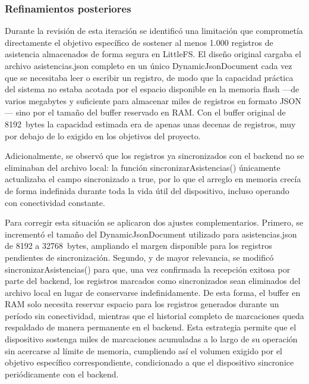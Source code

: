 \subsubsection{Refinamientos posteriores}

Durante la revisión de esta iteración se identificó una limitación que comprometía directamente el objetivo específico de sostener al menos 1.000 registros de asistencia almacenados de forma segura en LittleFS. El diseño original cargaba el archivo asistencias.json completo en un único DynamicJsonDocument cada vez que se necesitaba leer o escribir un registro, de modo que la capacidad práctica del sistema no estaba acotada por el espacio disponible en la memoria flash —de varios megabytes y suficiente para almacenar miles de registros en formato JSON— sino por el tamaño del buffer reservado en RAM. Con el buffer original de 8192~bytes la capacidad estimada era de apenas unas decenas de registros, muy por debajo de lo exigido en los objetivos del proyecto.

Adicionalmente, se observó que los registros ya sincronizados con el backend no se eliminaban del archivo local: la función sincronizarAsistencias() únicamente actualizaba el campo sincronizado a true, por lo que el arreglo en memoria crecía de forma indefinida durante toda la vida útil del dispositivo, incluso operando con conectividad constante.

Para corregir esta situación se aplicaron dos ajustes complementarios. Primero, se incrementó el tamaño del DynamicJsonDocument utilizado para asistencias.json de 8192 a 32768~bytes, ampliando el margen disponible para los registros pendientes de sincronización. Segundo, y de mayor relevancia, se modificó sincronizarAsistencias() para que, una vez confirmada la recepción exitosa por parte del backend, los registros marcados como sincronizados sean eliminados del archivo local en lugar de conservarse indefinidamente. De esta forma, el buffer en RAM solo necesita reservar espacio para los registros generados durante un período sin conectividad, mientras que el historial completo de marcaciones queda respaldado de manera permanente en el backend. Esta estrategia permite que el dispositivo sostenga miles de marcaciones acumuladas a lo largo de su operación sin acercarse al límite de memoria, cumpliendo así el volumen exigido por el objetivo específico correspondiente, condicionado a que el dispositivo sincronice periódicamente con el backend.


